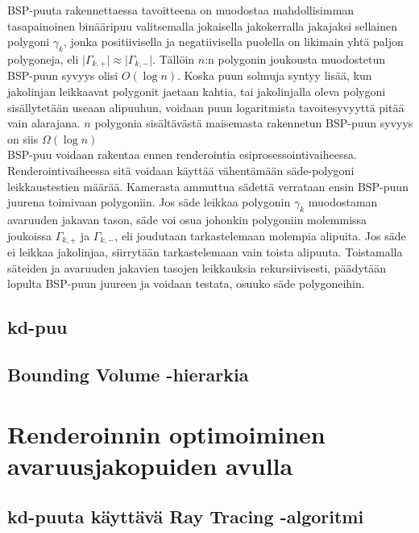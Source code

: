 \documentclass[a4paper,12pt, titlepage]{article}
\theoremstyle{break}
\newcommand{\abs}[1]{\vert #1 \vert} %
\begin{document}
BSP-puuta rakennettaessa tavoitteena on muodostaa mahdollisimman tasapainoinen binääripuu valitsemalla jokaisella jakokerralla jakajaksi sellainen polygoni $\gamma_k$, jonka positiivisella ja negatiivisella puolella on likimain yhtä paljon polygoneja, eli $\abs{\Gamma_{k,+}} \approx \abs{\Gamma_{k,-}}$. Tällöin  $n$:n polygonin joukousta muodostetun BSP-puun syvyys olisi $O(\log n)$. Koska puun solmuja syntyy lisää, kun jakolinjan leikkaavat polygonit jaetaan kahtia, tai jakolinjalla oleva polygoni sisällytetään useaan alipuuhun, voidaan puun logaritmista tavoitesyvyyttä pitää vain alarajana.\cite{hughes} $n$ polygonia sisältävästä maisemasta rakennetun BSP-puun syvyys on siis $\Omega(\log n)$\\

BSP-puu voidaan rakentaa ennen renderointia esiprosessointivaiheessa. Renderointivaiheessa sitä voidaan käyttää vähentämään säde-polygoni leikkaustestien määrää. Kamerasta ammuttua sädettä verrataan ensin BSP-puun juurena toimivaan polygoniin. Jos säde leikkaa polygonin $\gamma_k$ muodostaman avaruuden jakavan tason, säde voi osua johonkin polygoniin molemmissa joukoissa ${\Gamma_{k,+}}$ ja ${\Gamma_{k,-}}$, eli joudutaan tarkastelemaan molempia alipuita. Jos säde ei leikkaa jakolinjaa, siirrytään tarkastelemaan vain toista alipuuta. Toistamalla säteiden ja avaruuden jakavien tasojen leikkauksia rekursiivisesti, päädytään lopulta BSP-puun juureen ja voidaan testata, osuuko säde polygoneihin.\cite{ranta}\\

\subsection{kd-puu}
\subsection{Bounding Volume -hierarkia}

\newpage
\section{Renderoinnin optimoiminen avaruusjakopuiden avulla}
\subsection{kd-puuta käyttävä Ray Tracing -algoritmi}

\newpage

\listofalgorithms
\end{document}
